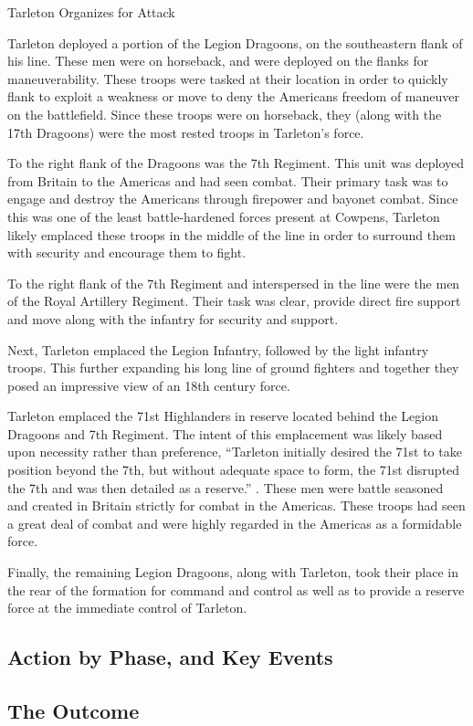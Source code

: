 Tarleton Organizes for Attack

Tarleton deployed a portion of the Legion Dragoons, on the southeastern flank
of his line. These men were on horseback, and were deployed on the flanks for
maneuverability. These troops were tasked at their location in order to quickly
flank to exploit a weakness or move to deny the Americans freedom of maneuver
on the battlefield. Since these troops were on horseback, they (along with the
17th Dragoons) were the most rested troops in Tarleton's force.

To the right flank of the Dragoons was the 7th Regiment. This unit was deployed
from Britain to the Americas and had seen combat. Their primary task was to
engage and destroy the Americans through firepower and bayonet combat. Since
this was one of the least battle-hardened forces present at Cowpens, Tarleton
likely emplaced these troops in the middle of the line in order to surround
them with security and encourage them to fight.

To the right flank of the 7th Regiment and interspersed in the line were the
men of the Royal Artillery Regiment. Their task was clear, provide direct fire
support and move along with the infantry
for security and support.

Next, Tarleton emplaced the Legion Infantry, followed by the light infantry
troops. This further expanding his long line of ground fighters and together
they posed an impressive view of an 18th century force.

Tarleton emplaced the 71st Highlanders in reserve located behind the Legion
Dragoons and 7th Regiment. The intent of this emplacement was likely based upon
necessity rather than preference, ``Tarleton initially desired the 71st to take
position beyond the 7th, but without adequate space to form, the 71st disrupted
the 7th and was then detailed as a reserve.'' \cite[84]{babits_devil_2001}. These men were
battle seasoned and created in Britain strictly for combat in the Americas.
These troops had seen a great deal of combat and were highly regarded in the
Americas as a formidable force.

Finally, the remaining Legion Dragoons, along with Tarleton, took their place
in the rear of the formation for command and control as well as to provide a
reserve force at the immediate control of Tarleton.

\subsection{Action by Phase, and Key Events}

\subsection{The Outcome}

